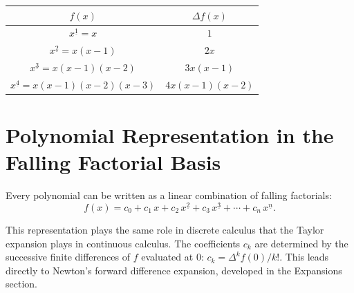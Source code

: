 \begin{center}
\renewcommand{\arraystretch}{1.4}
\begin{tabular}{c|c}
\(f(x)\) & \(\Delta f(x)\) \\
\hline
\(x^{\underline{1}} = x\) & \(1\) \\
\(x^{\underline{2}} = x(x-1)\) & \(2x\) \\
\(x^{\underline{3}} = x(x-1)(x-2)\) & \(3x(x-1)\) \\
\(x^{\underline{4}} = x(x-1)(x-2)(x-3)\) & \(4x(x-1)(x-2)\)
\end{tabular}
\end{center}

\section*{Polynomial Representation in the Falling Factorial Basis}

Every polynomial can be written as a linear combination of falling
factorials:
\[
f(x)
=
c_0
+ c_1\, x
+ c_2\, x^{\underline{2}}
+ c_3\, x^{\underline{3}}
+ \cdots
+ c_n\, x^{\underline{n}}.
\]

\begin{remark*}
This representation plays the same role in discrete calculus that the
Taylor expansion plays in continuous calculus. The coefficients \(c_k\)
are determined by the successive finite differences of \(f\) evaluated
at \(0\): \(c_k = \Delta^k f(0) / k!\). This leads directly to Newton's
forward difference expansion, developed in the Expansions section.
\end{remark*}
